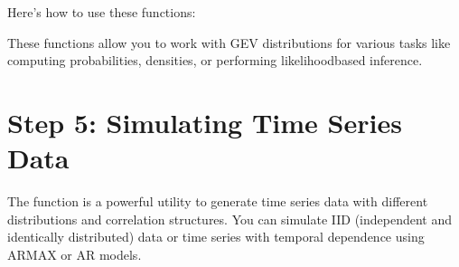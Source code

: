 \documentclass[a4paper,11pt,openany,english]{sphinxmanual}
\begin{document}
\sphinxAtStartPar
Here’s how to use these functions:

\begin{sphinxVerbatim}[commandchars=\\\{\}]
     

  \PYG{p}{[}    \PYG{p}{]}

     
 

     
 

     
 
\end{sphinxVerbatim}

\sphinxAtStartPar
These functions allow you to work with GEV distributions for various tasks like computing probabilities, densities, or performing likelihood\sphinxhyphen{}based inference.


\section{Step 5: Simulating Time Series Data}
\label{\detokenize{miscellaneous:step-5-simulating-time-series-data}}
\sphinxAtStartPar
The  function is a powerful utility to generate time series data with different distributions and correlation structures. You can simulate IID (independent and identically distributed) data or time series with temporal dependence using ARMAX or AR models.
\end{document}
